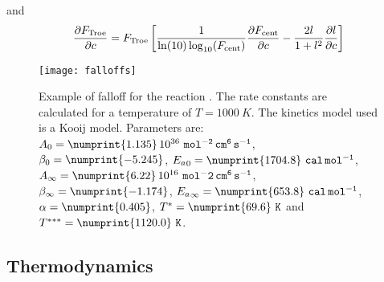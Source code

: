 and
\begin{equation}
\doverdc{\FTroe} = \FTroe \left[
                                  \frac{1}{\ln(10)\log_{10}(\TroeFcent)}\doverdc{\TroeFcent}
                                - \frac{2 l}{1 + l^2} \doverdc{l}
                          \right]
\end{equation}
\begin{figure}
\centering
\texttt{[image: falloffs]}
\caption{\label{kinetics::falloffs}%
Example of falloff for the reaction .
The rate constants are calculated for a temperature of $T = 1000~\unit{K}$. The kinetics model
used is a Kooij model. Parameters are:
$\PreExp_0      = \numprint{1.135}\,10^{36}~\unit{mol^{-2}\,cm^6\,s^{-1}}$,
$\Power_0       = \numprint{-5.245}$,
$\AcEn_0        = \numprint{1704.8}~\unit{cal\,mol^{-1}}$,
$\PreExp_\infty = \numprint{6.22}\,10^{16}~\unit{mol^-2\,cm^6\,s^{-1}}$,
$\Power_\infty  = \numprint{-1.174}$,
$\AcEn_\infty   = \numprint{653.8}~\unit{cal\,mol^{-1}}$,
$\Troealpha     = \numprint{0.405}$,
$\TroeTone      = \numprint{69.6}~\unit{K}$ and
$\TroeTthree    = \numprint{1120.0}~\unit{K}$.}
\end{figure}

\subsection{Thermodynamics}
\label{phys:NASA_therm}

